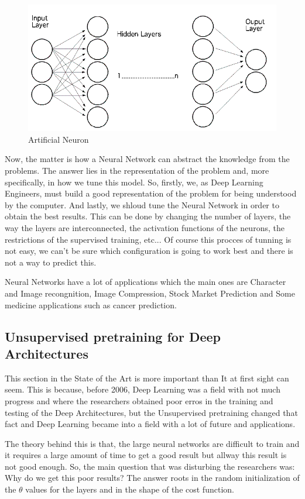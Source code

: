 \documentclass[12pt]{article}
\begin{document}
\begin{figure}[ht]
\centering
\includegraphics[width=.4\textwidth]{network.png}
\caption{Artificial Neuron}
\label{fig:figure2}
\end{figure}

Now, the matter is how a Neural Network can abstract the knowledge from the problems. The answer lies in the representation of the problem and, more specifically, in how we tune this model. So, firstly, we, as Deep Learning Engineers, must build a good representation of the problem for being understood by the computer. And lastly, we shloud tune the Neural Network in order to obtain the best results. This can be done by changing the number of layers, the way the layers are interconnected, the activation functions of the neurons, the restrictions of the supervised training, etc... Of course this procces of tunning is not easy, we can't be sure which configuration is going to work best and there is not a way to predict this.

Neural Networks have a lot of applications which the main ones are Character and Image recongnition, Image Compression, Stock Market Prediction and Some medicine applications such as cancer prediction.

\subsection{Unsupervised pretraining for Deep Architectures\cite{erhan2010does,bengio2007greedy}}
\label{sec:UnPre}
This section in the State of the Art is more important than It at first sight can seem. This is because, before 2006, Deep Learning was a field with not much progress and where the researchers obtained poor erros in the training and testing of the Deep Architectures, but the Unsupervised pretraining changed that fact and Deep Learning became into a field with a lot of future and applications.

The theory behind this is that, the large neural networks are difficult to train and it requires a large amount of time to get a good result but allway this result is not good enough. So, the main question that was disturbing the researchers was: Why do we get this poor results? The answer roots in the random initialization of the $\theta$ values for the layers and in the shape of the cost function.
\end{document}
